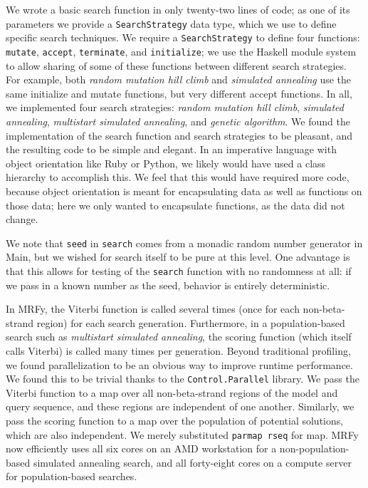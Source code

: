 \documentclass[preprint,nonatbib,blockstyle,nocopyrightspace,times]{sigplanconf}
\begin{document}
We wrote a basic search function in only twenty-two lines of code; as one of 
its parameters we provide a \texttt{SearchStrategy} data type, which we use to 
define specific search techniques.
We require a \texttt{SearchStrategy} to 
define four functions: \texttt{mutate}, \texttt{accept}, \texttt{terminate}, 
and \texttt{initialize}; we use the Haskell module system to allow sharing of 
some of these functions between different search strategies.
For example, both 
\textit{random mutation hill climb} and \textit{simulated annealing} use the 
same initialize and mutate functions, but very different accept functions.
In 
all, we implemented four search strategies: \textit{random mutation hill 
climb}, \textit{simulated annealing}, \textit{multistart simulated annealing}, 
and \textit{genetic algorithm}.
We found the implementation of the search 
function and search strategies to be pleasant, and the resulting code to be 
simple and elegant.
In an imperative language with object orientation like Ruby 
or Python, we likely would have used a class hierarchy to accomplish this.
We 
feel that this would have required more code, because object orientation is 
meant for encapsulating data as well as functions on those data; here we only 
wanted to encapsulate functions, as the data did not change.


We note that \texttt{seed} in \texttt{search} comes from a monadic random 
number generator in Main, but we wished for search itself to be pure at this 
level.
One advantage is that this allows for testing of the \texttt{search} 
function with no randomness at all: if we pass in a known number as the seed, 
behavior is entirely deterministic.


\begin{figure}

\end{figure}

In MRFy, the Viterbi function is called several times (once for each 
non-beta-strand region) for each search generation.
Furthermore, in a 
population-based search such as \textit{multistart simulated annealing}, the 
scoring function (which itself calls Viterbi) is called many times per 
generation.
Beyond traditional profiling, we found parallelization to be an 
obvious way to improve runtime performance.
We found this to be trivial thanks 
to the \texttt{Control.Parallel} library.
We pass the Viterbi function to a map over all 
non-beta-strand regions of the model and query sequence, and these regions are 
independent of one another.
Similarly, we pass the scoring function to a map 
over the population of potential solutions, which are also independent.
We 
merely substituted \texttt{parmap rseq} for map.
MRFy now efficiently uses all six 
cores on an AMD workstation for a non-population-based simulated annealing 
search, and all forty-eight cores on a compute server for population-based 
searches.
\end{document}
